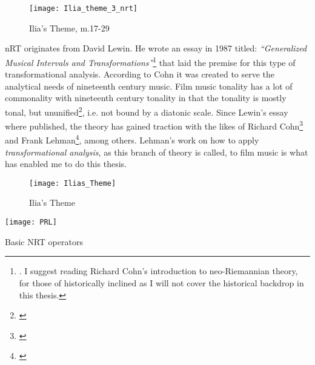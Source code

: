 \begin{figure}[h!]
\center
\texttt{[image: Ilia\_theme\_3\_nrt]}
	\caption{Ilia's Theme, m.17-29}
	\label{Ilia_theme_3_nrt}
\end{figure}

\ac{nRT} originates from David Lewin. He wrote an essay in 1987 titled: \textit{``Generalized Musical Intervals and Transformations''}\footnote{\textcite{lewin_generalized_2007}. I suggest reading Richard Cohn's introduction to neo-Riemannian theory, \parencite{cohn_introduction_1998} for those of historically inclined as I will not cover the historical backdrop in this thesis.} that laid the premise for this type of transformational analysis. According to Cohn it was created to serve the analytical needs of nineteenth century music. Film music tonality has a lot of commonality with nineteenth century tonality in that the tonality is mostly tonal, but ununified\footnote{\textcite[p.2]{cohn_introduction_1998}}, i.e. not bound by a diatonic scale. Since Lewin's essay where published, the theory has gained traction with the likes of Richard Cohn\footnote{\textcite{cohn_maximally_1996}} and Frank Lehman\footnote{\textcite{lehman_reading_2012}}, among others. Lehman's work on how to apply \textit{transformational analysis}, as this branch of theory is called, to film music is what has enabled me to do this thesis.

\begin{figure*}
\center
\texttt{[image: Ilias\_Theme]}
	\caption{Ilia's Theme}
	\label{Ilias_Theme}
\end{figure*}

\begin{marginfigure}
\texttt{[image: PRL]}
\caption{Basic NRT operators}
\label{fg:prl}
\end{marginfigure}

